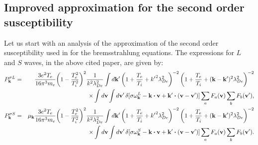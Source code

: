 \documentclass[12pt,a4paper,ruledheader]{report}
\begin{document}
\begin{appendix}
\chapter{Improved approximation for the second order susceptibility}
\label{appA}
\setcounter{equation}{0}
\renewcommand{\theequation}{A\arabic{equation}}
Let us start with an analysis of the approximation of the second order
susceptibility used in \cite{YZKS16} for the bremsstrahlung equations.
The expressions for $L$ and $S$ waves, in the above cited paper, are
given by:
\begin{eqnarray}
\label{bremsst,L,1}
P_{\bf k}^{\sigma L} &=& \frac{3e^2T_e}{16\pi^3m_e}
\biggl(1-\frac{T_e^2}{T_i^2}\biggr)^2\frac{1}{k^2\lambda_{De}^2}
\int d{\bf k}'\left(1+\frac{T_e}{T_i}
+{k'}^2\lambda_{De}^2\right)^{-2}\left(1+\frac{T_e}{T_i}
+({\bf k}-{\bf k}')^2\lambda_{De}^2\right)^{-2}
\nonumber\\
&& \times\int d{\bf v}\int d{\bf v}'\,
\delta[\sigma\omega_{\bf k}^L-{\bf k}\bm{\cdot}{\bf v}
+{\bf k}'\bm{\cdot}({\bf v}-{\bf v}')]
\sum_aF_a({\bf v})\sum_bF_b({\bf v}'),
\\
\label{bremsst,S,1}
P_{\bf k}^{\sigma S} &=& \mu_{\bf k}\frac{3e^2T_e}{16\pi^3m_e}
\biggl(1-\frac{T_e^2}{T_i^2}\biggr)^2\frac{1}{k^2\lambda_{De}^2}
\int d{\bf k}'\left(1+\frac{T_e}{T_i}
+{k'}^2\lambda_{De}^2\right)^{-2}\left(1+\frac{T_e}{T_i}
+({\bf k}-{\bf k}')^2\lambda_{De}^2\right)^{-2}
\nonumber\\
&& \times\int d{\bf v}\int d{\bf v}'\,
\delta[\sigma\omega_{\bf k}^S-{\bf k}\bm{\cdot}{\bf v}
+{\bf k}'\bm{\cdot}({\bf v}-{\bf v}')]
\sum_aF_a({\bf v})\sum_bF_b({\bf v}').
\end{eqnarray}


\end{appendix}
\end{document}
